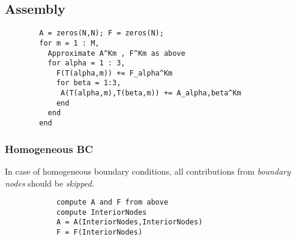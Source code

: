 \subsection{Assembly}
    \makeatletter \@totalleftmargin=-1.1cm \makeatother
    \begin{verbatim}
        A = zeros(N,N); F = zeros(N);
        for m = 1 : M,
          Approximate A^Km , F^Km as above
          for alpha = 1 : 3,
            F(T(alpha,m)) += F_alpha^Km
            for beta = 1:3,
             A(T(alpha,m),T(beta,m)) += A_alpha,beta^Km
            end
          end
        end
    \end{verbatim}\vspace{-1.5em}
    \subsubsection{Homogeneous BC}
        In case of homogeneous boundary conditions, all contributions from \textit{boundary nodes} should be \textit{skipped}.
        \makeatletter \@totalleftmargin=-1.7cm \makeatother
        \begin{verbatim}
            compute A and F from above
            compute InteriorNodes
            A = A(InteriorNodes,InteriorNodes)
            F = F(InteriorNodes)
        \end{verbatim}
        \vspace{-1.25em}